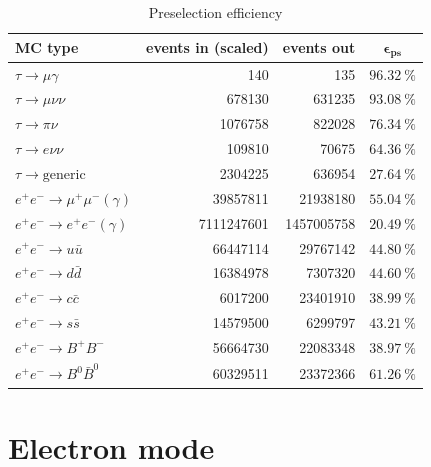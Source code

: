 \documentclass[12pt]{thesis}  %
\begin{document}
\begin{table}[h]
\centering
\begin{tabular}{lrrc}
\textbf{MC type}         & \textbf{events in (scaled)} & \textbf{events out} & $\mathbf{\epsilon_{\text{ps}}}$ \\ \hline 
\rowcolor[HTML]{EFEFEF} 
$\tau\to\mu\gamma$       & \num{140}        & \num{135}      & $\SI{96.32}{\percent}$                   \\
$\tau\to\mu\nu\nu$      & \num{678130}         & \num{631235}          & $\SI{93.08}{\percent}$           \\
$\tau\to\pi\nu$         & \num{1076758}       & \num{822028}          & $\SI{76.34}{\percent}$            \\
$\tau\to e\nu\nu$       & \num{109810}        & \num{70675}         & $\SI{64.36}{\percent}$      \\
$\tau\to\text{generic}$  & \num{2304225}       & \num{636954}          & $\SI{27.64}{\percent}$         \\
$e^+ e^- \to \mu^+ \mu^- (\gamma)$   & \num{39857811}    & \num{21938180}     & $\SI{55.04}{\percent}$   \\
$e^+ e^- \to e^+ e^- (\gamma)$      & \num{7111247601}      & \num{1457005758}       & $\SI{20.49}{\percent}$     \\
$e^+ e^- \to u \bar{u}$       & \num{66447114}           & \num{29767142}  & $\SI{44.80}{\percent}$ \\
$e^+ e^- \to d \bar{d}$        & \num{16384978}       & \num{7307320}      & $\SI{44.60}{\percent}$       \\
$e^+ e^- \to c \bar{c}$        & \num{6017200}       & \num{23401910}           & $\SI{38.99}{\percent}$          \\
$e^+ e^- \to s \bar{s}$       & \num{14579500}     & \num{6299797}            & $\SI{43.21}{\percent}$         \\
$e^+ e^- \to B^+ B^-$     & \num{56664730}       & \num{22083348}           & $\SI{38.97}{\percent}$          \\
$e^+ e^- \to B^0 \bar{B}^0$       & \num{60329511}           & \num{23372366}        & $\SI{61.26}{\percent}$              
\end{tabular}
\caption{Preselection efficiency}
\label{my-label}
\end{table}


\section{Electron mode}
\end{document}

